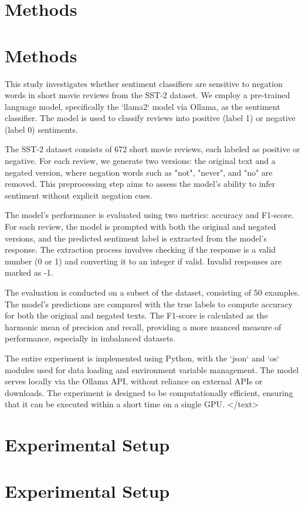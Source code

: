 \documentclass{article}
\begin{document}
\section{Methods}
\section{Methods}

This study investigates whether sentiment classifiers are sensitive to negation words in short movie reviews from the SST-2 dataset. We employ a pre-trained language model, specifically the `llama2` model via Ollama, as the sentiment classifier. The model is used to classify reviews into positive (label 1) or negative (label 0) sentiments. 

The SST-2 dataset consists of 672 short movie reviews, each labeled as positive or negative. For each review, we generate two versions: the original text and a negated version, where negation words such as "not", "never", and "no" are removed. This preprocessing step aims to assess the model's ability to infer sentiment without explicit negation cues.

The model's performance is evaluated using two metrics: accuracy and F1-score. For each review, the model is prompted with both the original and negated versions, and the predicted sentiment label is extracted from the model's response. The extraction process involves checking if the response is a valid number (0 or 1) and converting it to an integer if valid. Invalid responses are marked as -1.

The evaluation is conducted on a subset of the dataset, consisting of 50 examples. The model's predictions are compared with the true labels to compute accuracy for both the original and negated texts. The F1-score is calculated as the harmonic mean of precision and recall, providing a more nuanced measure of performance, especially in imbalanced datasets.

The entire experiment is implemented using Python, with the `json` and `os` modules used for data loading and environment variable management. The model serves locally via the Ollama API, without reliance on external APIs or downloads. The experiment is designed to be computationally efficient, ensuring that it can be executed within a short time on a single GPU.
</text>
\section{Experimental Setup}
\section{Experimental Setup}
\end{document}
